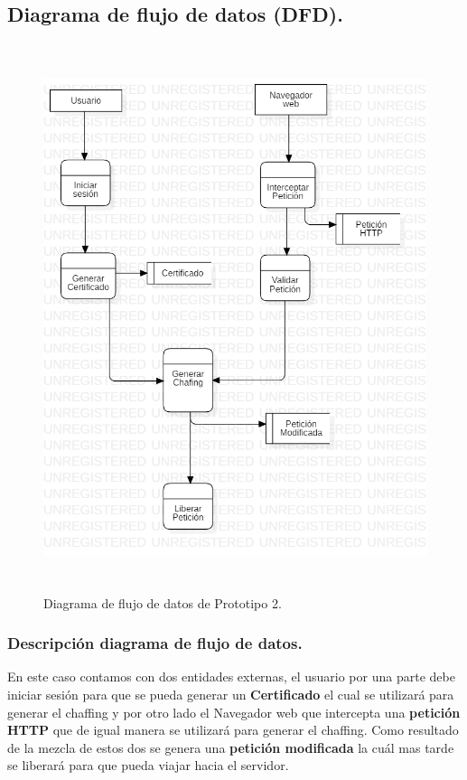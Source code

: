 \documentclass[12pt, a4paper, titlepage]{report}
\begin{document}
			\subsection{Diagrama de flujo de datos (DFD).}
			    \begin{figure}[H]
					\begin{center}			        	    \includegraphics[height=16cm]{./imagenes/Desarrollo/Prototipo_2/DFD_P2.png}
						\caption{Diagrama de flujo de datos de Prototipo 2.}
					\end{center}
				\end{figure}
			    
			    \subsubsection{Descripción diagrama de flujo de datos.}
			        En este caso contamos con dos entidades externas, el usuario por una parte debe iniciar sesión para que se pueda generar un \textbf{Certificado} el cual se utilizará para generar el chaffing y por otro lado el Navegador web que intercepta una \textbf{petición HTTP} que de igual manera se utilizará para generar el chaffing. Como resultado de la mezcla de estos dos se genera una \textbf{petición modificada} la cuál mas tarde se liberará para que pueda viajar hacia el servidor.
			   
\end{document}

